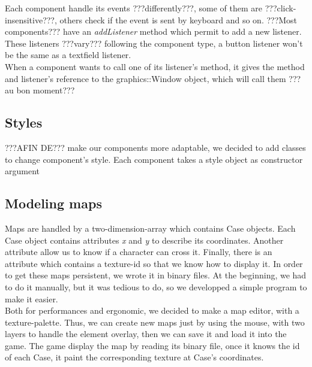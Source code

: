 \documentclass{scrreprt}
\begin{document}
	Each component handle its events ???differently???, some of them are ???click-insensitive???, others check if the event is sent by keyboard and so on.
	???Most components??? have an \emph{addListener} method which permit to add a new listener. These listeners ???vary??? following the component type, a button listener won't be the same as a textfield listener.\\

	When a component wants to call one of its listener's method, it gives the method and listener's reference to the graphics::Window object, which will call them ???au bon moment???

	\subsection{Styles}
	???AFIN DE??? make our components more adaptable, we decided to add classes to change component's style. Each component takes a style object as constructor argument


	\subsection{Modeling maps}
	Maps are handled by a two-dimension-array which contains Case objects. Each Case object contains attributes \emph{x} and \emph{y} to describe its coordinates. Another attribute allow us to know if a character can cross it. Finally, there is an attribute which contains a texture-id so that we know how to display it. In order to get these maps persistent, we wrote it in binary files. At the beginning, we had to do it manually, but it was tedious to do, so we developped a simple program to make it easier.\\

	Both for performances and ergonomic, we decided to make a map editor, with a texture-palette. Thus, we can create new maps just by using the mouse, with two layers to handle the element overlay, then we can save it and load it into the game. The game display the map by reading its binary file, once it knows the id of each Case, it paint the corresponding texture at Case's coordinates.
\end{document}
